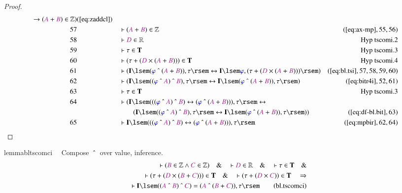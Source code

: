 \begin{proof}
\begin{align}
      \rightarrow ( \mc{A} + \mc{B} ) \in \mathbb{Z}
      )&(\mbox{\ref{eq:zaddcl}})\notag
  \\ 57 &&  & \vdash ( \mc{A} + \mc{B} ) \in
      \mathbb{Z}&(\mbox{\ref{eq:ax-mp}},55,56)\notag
  \\ 58 &&  & \vdash \mc{D} \in
      \mathbb{R}&\text{Hyp~tscomi.2}\notag%
  \\ 59 &&  & \vdash \tau \in \mathbf{T}&\text{Hyp~tscomi.3}\notag%
  \\ 60 &&  & \vdash ( \tau + ( \mc{D} \times ( \mc{A} + \mc{B} ) ) ) \in
      \mathbf{T}&\text{Hyp~tscomi.4}\notag%
  \\ 61 &&  & \vdash ( \mathbf{I} \lsem ( \mw{\varphi} ~\string^~ ( \mc{A} +
      \mc{B} ) ) , \tau \rsem \leftrightarrow \mathbf{I}
      \lsem \mw{\varphi} , ( \tau + ( \mc{D} \times ( \mc{A}
      + \mc{B} ) ) ) \rsem
      )&(\mbox{\ref{eq:bl.tsi}},57,58,59,60)\notag
  \\ 62 &&  & \vdash ( \mathbf{I} \lsem ( ( \mw{\varphi} ~\string^~ \mc{A} )
      ~\string^~ \mc{B} ) , \tau \rsem \leftrightarrow
      \mathbf{I} \lsem ( \mw{\varphi} ~\string^~ ( \mc{A} +
      \mc{B} ) ) , \tau \rsem
      )&(\mbox{\ref{eq:bitr4i}},52,61)\notag
  \\ 63 &&  & \vdash \tau \in \mathbf{T}&\text{Hyp~tscomi.3}\notag%
  \\ 64 &&  & \vdash ( \mathbf{I} \lsem ( ( ( \mw{\varphi} ~\string^~ \mc{A} )
      ~\string^~ \mc{B} ) \leftrightarrow ( \mw{\varphi}
      ~\string^~ ( \mc{A} + \mc{B} ) ) ) , \tau \rsem
      \leftrightarrow  \notag \\ & & & \qquad
      ( \mathbf{I} \lsem ( ( \mw{\varphi}
      ~\string^~ \mc{A} ) ~\string^~ \mc{B} ) , \tau \rsem
      \leftrightarrow \mathbf{I} \lsem ( \mw{\varphi}
      ~\string^~ ( \mc{A} + \mc{B} ) ) , \tau \rsem )
      )&(\mbox{\ref{eq:df-bl.bit}},63)\notag
  \\ 65 &&  & \vdash \mathbf{I} \lsem ( ( ( \mw{\varphi} ~\string^~ \mc{A} )
      ~\string^~ \mc{B} ) \leftrightarrow ( \mw{\varphi}
      ~\string^~ ( \mc{A} + \mc{B} ) ) ) , \tau
      \rsem&(\mbox{\ref{eq:mpbir}},62,64)\notag
\end{align}
\end{proof}

\begin{restatable}{lemma}{bltscomci}~~ Compose $~\string^~$  over value,
inference.
\begin{align}
\vdash ( \mc{B} \in \mathbb{Z} \wedge \mc{C} \in \mathbb{Z} )\quad\&\quad
    \vdash \mc{D} \in \mathbb{R}\quad\&\quad \vdash \tau \in
    \mathbf{T}\quad\& \notag \\ %
      \quad \vdash ( \tau + ( \mc{D} \times ( \mc{B} + \mc{C} ) )
    ) \in \mathbf{T}\quad\&\quad \vdash ( \tau + ( \mc{D} \times \mc{C} ) ) \in
    \mathbf{T}\quad\Rightarrow \notag \\ %
      \quad \vdash \mathbf{I} \lsem ( ( \mc{A}
    ~\string^~ \mc{B} ) ~\string^~ \mc{C} ) = ( \mc{A} ~\string^~ ( \mc{B} +
    \mc{C} ) ) , \tau \rsem\label{eq:bl.tscomci}\tag{bl.tscomci}
\end{align}
\end{restatable}

